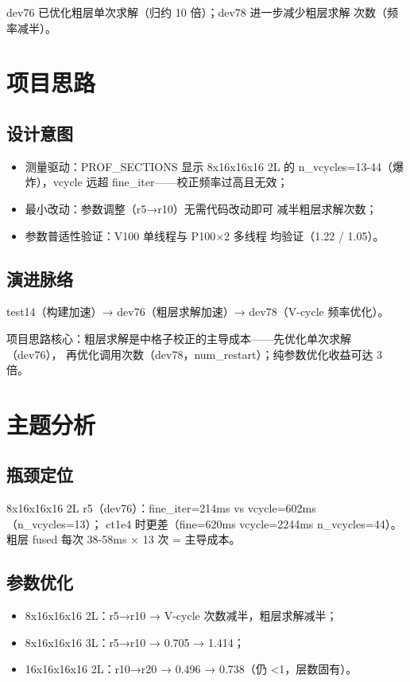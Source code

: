 \documentclass[UTF8]{ctexart}
\begin{document}
dev76 已优化粗层单次求解（归约 10 倍）；dev78 进一步减少粗层求解
\textcolor{relation}{次数}（频率减半）。

\section{项目思路}
\subsection{设计意图}
\begin{itemize}
\item \textcolor{idea}{测量驱动}：PROF\_SECTIONS 显示 8x16x16x16 2L 的
  n\_vcycles=13-44（爆炸），vcycle 远超 fine\_iter——校正频率过高且无效；
\item \textcolor{idea}{最小改动}：参数调整（r5→r10）无需代码改动即可
  减半粗层求解次数；
\item \textcolor{idea}{参数普适性验证}：V100 单线程与 P100×2 多线程
  均验证（1.22 / 1.05）。
\end{itemize}
\subsection{演进脉络}
test14（构建加速）→ dev76（粗层求解加速）→ dev78（V-cycle 频率优化）。

\begin{ideabox}
项目思路核心：粗层求解是中格子校正的主导成本——先优化单次求解（dev76），
再优化调用次数（dev78，num\_restart）；纯参数优化收益可达 3 倍。
\end{ideabox}

\section{主题分析}
\subsection{瓶颈定位}
8x16x16x16 2L r5（dev76）：fine\_iter=214ms vs vcycle=602ms（n\_vcycles=13）；
ct1e4 时更差（fine=620ms vcycle=2244ms n\_vcycles=44）。粗层 fused 每次
38-58ms × 13 次 = 主导成本。

\subsection{参数优化}
\begin{itemize}
\item 8x16x16x16 2L：r5→r10 → V-cycle 次数减半，粗层求解减半；
\item 8x16x16x16 3L：r5→r10 → 0.705 → 1.414；
\item 16x16x16x16 2L：r10→r20 → 0.496 → 0.738（仍 <1，层数固有）。
\end{itemize}
\end{document}
